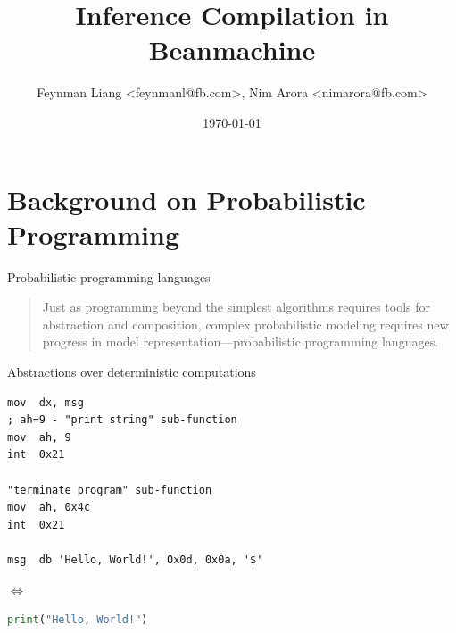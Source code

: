 \documentclass{beamer}
\title{Inference Compilation in Beanmachine}
\date{\today}
\author{Feynman Liang <feynmanl@fb.com>, Nim Arora <nimarora@fb.com>}
\institute{PPL <: Probability <: AI Infra <: Facebook}
\begin{document}
\maketitle



\section{Background on Probabilistic Programming}

\begin{frame}[fragile]{Probabilistic programming languages}

\begin{quote}
    Just as programming beyond the simplest algorithms requires tools for abstraction and composition, complex probabilistic modeling requires new progress in model representation—probabilistic programming languages.
\end{quote}
\cite{goodman2013principles}
\end{frame}

\begin{frame}[fragile]{Abstractions over deterministic computations}
\begin{minipage}{0.4\linewidth}
    \begin{lstlisting}[language={[x86masm]Assembler}] 
mov  dx, msg
; ah=9 - "print string" sub-function
mov  ah, 9
int  0x21

"terminate program" sub-function
mov  ah, 0x4c
int  0x21

msg  db 'Hello, World!', 0x0d, 0x0a, '$'
    \end{lstlisting}
\end{minipage}$\iff$
\begin{minipage}{0.48\linewidth}
    \begin{lstlisting}[language=python]
    print("Hello, World!")
    \end{lstlisting}
\end{minipage}
\end{frame}
\end{document}
